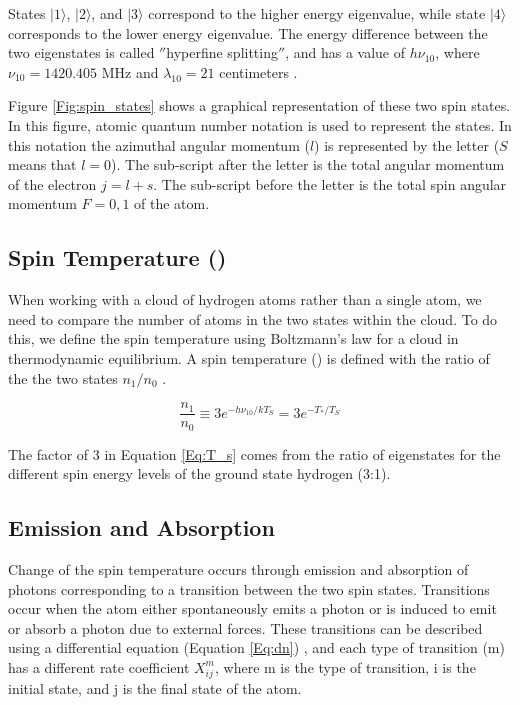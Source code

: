 States $| 1 \rangle$, $| 2 \rangle$, and $| 3 \rangle$ correspond to the higher energy eigenvalue, while state $| 4 \rangle$ corresponds to the lower energy eigenvalue. The energy difference between the two eigenstates is called $''$hyperfine splitting$''$, and has a value of $h \nu_{10}$, where $\nu_{10}=1420.405$ MHz and $\lambda_{10} =  21$ centimeters \cite{townsend2000}. 

Figure \ref{Fig:spin_states} shows a graphical representation of these two spin states. In this figure, atomic quantum number notation is used to represent the states. In this notation the azimuthal angular momentum ($l$) is represented by the letter ($S$ means that $l=0$). The sub-script after the letter is the total angular momentum of the electron $j=l+s$. The sub-script before the letter is the total spin angular momentum $F=0,1$ of the atom. 


\subsection{Spin Temperature (\ts)}

When working with a cloud of hydrogen atoms rather than a single atom, we need to compare the number of atoms in the two states within the cloud. To do this, we define the spin temperature using Boltzmann's law for a cloud in thermodynamic equilibrium. A spin temperature (\ts) is defined with the ratio of the the two states $n_1/n_0$ \cite{field_1958}. 

\begin{equation}\label{Eq:T_s}
\frac{n_1}{n_0} \equiv 3 e^{- h \nu_{10} / kT_S} = 3 e^{-T_*/T_S}
\end{equation} 

The factor of 3 in Equation \ref{Eq:T_s} comes from the ratio of eigenstates for the different spin energy levels of the ground state hydrogen (3:1). 


\subsection{Emission and Absorption} \label{Sec:dT_S}

Change of the spin temperature occurs through emission and absorption of \cm photons corresponding to a transition between the two spin states. Transitions occur when the atom either spontaneously emits a photon or is induced to emit or absorb a photon due to external forces. These transitions can be described using a differential equation (Equation \ref{Eq:dn}) \cite{furlanetto_2006}, and each type of transition (m) has a different rate coefficient $X^m_{ij}$, where m is the type of transition, i is the initial state, and j is the final state of the atom. 

